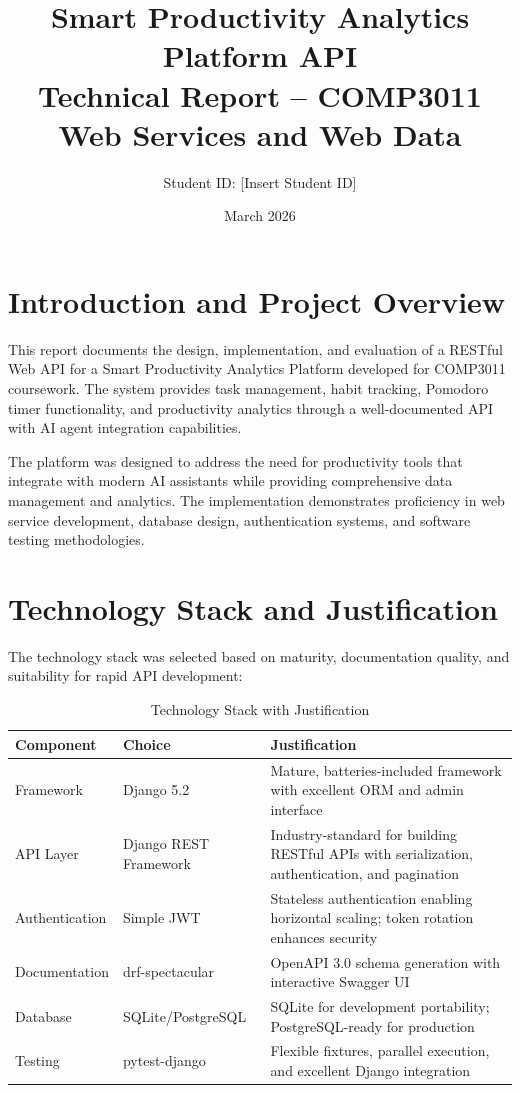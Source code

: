 \documentclass[11pt,a4paper]{article}
\title{\textbf{Smart Productivity Analytics Platform API}\\[0.3cm]\large Technical Report -- COMP3011 Web Services and Web Data}
\author{Student ID: [Insert Student ID]}
\date{March 2026}
\begin{document}
\maketitle
\thispagestyle{fancy}

\section{Introduction and Project Overview}

This report documents the design, implementation, and evaluation of a RESTful Web API for a Smart Productivity Analytics Platform developed for COMP3011 coursework. The system provides task management, habit tracking, Pomodoro timer functionality, and productivity analytics through a well-documented API with AI agent integration capabilities.

The platform was designed to address the need for productivity tools that integrate with modern AI assistants while providing comprehensive data management and analytics. The implementation demonstrates proficiency in web service development, database design, authentication systems, and software testing methodologies.

\section{Technology Stack and Justification}

The technology stack was selected based on maturity, documentation quality, and suitability for rapid API development:

\begin{table}[H]
\centering
\small
\begin{tabular}{@{}llp{7cm}@{}}
\toprule
\textbf{Component} & \textbf{Choice} & \textbf{Justification} \\
\midrule
Framework & Django 5.2 & Mature, batteries-included framework with excellent ORM and admin interface \\
API Layer & Django REST Framework & Industry-standard for building RESTful APIs with serialization, authentication, and pagination \\
Authentication & Simple JWT & Stateless authentication enabling horizontal scaling; token rotation enhances security \\
Documentation & drf-spectacular & OpenAPI 3.0 schema generation with interactive Swagger UI \\
Database & SQLite/PostgreSQL & SQLite for development portability; PostgreSQL-ready for production \\
Testing & pytest-django & Flexible fixtures, parallel execution, and excellent Django integration \\
\bottomrule
\end{tabular}
\caption{Technology Stack with Justification}
\end{table}
\end{document}
